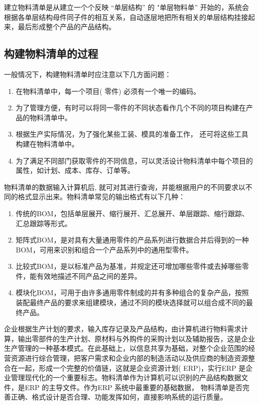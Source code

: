     建立物料清单是从建立一个个反映 “单层结构” 的 "单层物料单” 开始的，系统会根据各单层结构母件同子件的相互关系，自动逐层地把所有相关的单层结构挂接起来，最后形成整个产品的产品结构。

\subsection {构建物料清单的过程}

    一般情况下，构建物料清单时应注意以下几方面问题：

        \begin{enumerate}
            \item  在物料清单中，每一个项目( 零件) 必须有一个唯一的编码。
            \item  为了管理方便，有时可以将同一零件的不同状态看作几个不同的项目构建在产品的物料清单中。
            \item  根据生产实际情况，为了强化某些工装、模具的准备工作， 还可将这些工具构建在物料清单中。
            \item  为了满足不同部门获取零件的不同信息，可以灵活设计物料清单中每个项目的属性，如计划、成本、库存、订单等。
        \end{enumerate}

    物料清单的数据输入计算机后, 就可对其进行查询，并能根据用户的不同要求以不同的格式显示出来。物料清单常见的输出格式有以下几种：

        \begin{enumerate}
            \item  传统的BOM，包括单层展开、缩行展开、汇总展开、单层跟踪、缩行跟踪、汇总跟踪等形式。
            \item  矩阵式BOM，是对具有大量通用零件的产品系列进行数据合并后得到的一种BOM，可用来识别和组合一个产品系列中的通用型零件。
            \item  比较式BOM，是以标准产品为基准，并规定还可增加哪些零件或去掉哪些零件，能有效地描述不同产品之间的差异。
            \item  模块化BOM，可用于由许多通用零件制成的并有多种组合的复杂产品，按照装配最终产品的要求来组建模块，通过不同的模块选择就可以组合成不同的最终产品。
        \end{enumerate}

     企业根据生产计划的要求，输入库存记录及产品结构，由计算机进行物料需求计算，输出零部件的生产计划、原材料与外购件的采购计划以及辅助报告，这是企业生产管理的一种基本模式。在此基础上，以信息共享为基础，对整个企业范围的经营资源进行综合管理，把客户需求和企业内部的制造活动以及供应商的制造资源整合在一起，形成一个完整的价值链，这就是企业资源计划( ERP)，实行ERP 是企业管理现代化的一个重要标志。物料清单作为计算机可以识别的产品结构数据文件，是ERP 的主导文件。作为ERP 系统中最重要的基础数据， 物料清单是否完善正确、格式设计是否合理、功能发挥如何，直接影响系统的运行质量。

